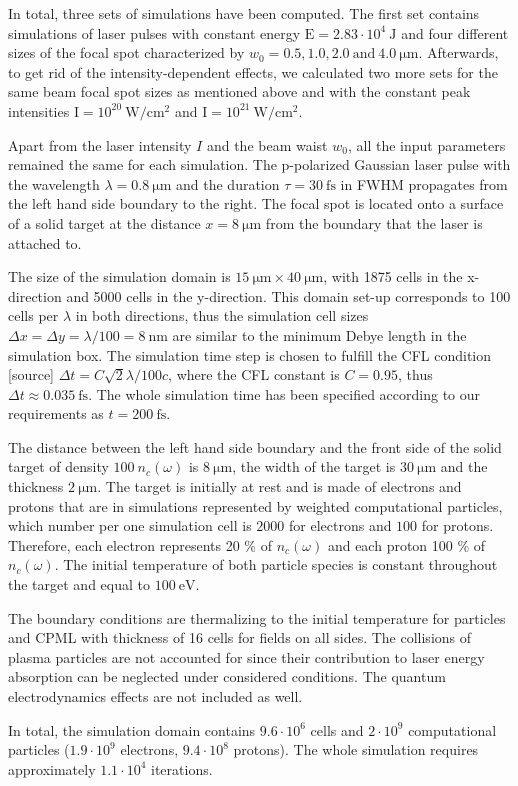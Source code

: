 In total, three sets of simulations have been computed. The first set contains simulations of laser pulses with constant energy $ \mathrm{E} = 2.83 \cdot 10^{4} \ \mathrm{J} $ and four different sizes of the focal spot characterized by $ w_0 = 0.5, 1.0, 2.0 \ \mathrm{and} \ 4.0 \ \mathrm{\mu m} $. Afterwards, to get rid of the intensity-dependent effects, we calculated two more sets for the same beam focal spot sizes as mentioned above and with the constant peak intensities $ \mathrm{I} = 10^{20} \ \mathrm{W/cm^2} $ and $ \mathrm{I} = 10^{21} \ \mathrm{W/cm^2} $.

Apart from the laser intensity $ I $ and the beam waist $ w_0 $, all the input parameters remained the same for each simulation. The p-polarized Gaussian laser pulse with the wavelength $ \lambda = 0.8 \ \mathrm{\mu m} $ and the duration $ \tau = 30 \ \mathrm{fs} $ in FWHM propagates from the left hand side boundary to the right. The focal spot is located onto a surface of a solid target at the distance $ x = 8 \ \mathrm{\mu m} $ from the boundary that the laser is attached to. 

The size of the simulation domain is $ 15 \ \mathrm{\mu m} \times 40 \ \mathrm{\mu m} $, with 1875 cells in the x-direction and 5000 cells in the y-direction. This domain set-up corresponds to 100 cells per $ \lambda $ in both directions, thus the simulation cell sizes $ \Delta x = \Delta y = \lambda/100 = 8 \ \mathrm{nm} $ are similar to the minimum Debye length in the simulation box. The simulation time step is chosen to fulfill the CFL condition [source] $ \Delta t = C \sqrt{2} \lambda/ 100 c $, where the CFL constant is $ C = 0.95 $, thus $ \Delta t \approx 0.035 \ \mathrm{fs} $. The whole simulation time has been specified according to our requirements as $ t = 200 \ \mathrm{fs} $.

The distance between the left hand side boundary and the front side of the solid target of density $ 100 \ n_c \left(\omega \right) $ is $ 8 \ \mathrm{\mu m} $, the width of the target is $ 30 \ \mathrm{\mu m} $ and the thickness $ 2 \ \mathrm{\mu m} $. The target is initially at rest and is made of electrons and protons that are in simulations represented by weighted computational particles, which number per one simulation cell is $ 2000 $ for electrons and $ 100 $ for protons. Therefore, each electron represents 20 \% of $ n_c \left(\omega \right) $ and each proton 100 \% of $ n_c \left(\omega \right) $. The initial temperature of both particle species is constant throughout the target and equal to $ 100 \ \mathrm{eV} $.

The boundary conditions are thermalizing to the initial temperature for particles and CPML with thickness of 16 cells for fields on all sides. The collisions of plasma particles are not accounted for since their contribution to laser energy absorption can be neglected under considered conditions. The quantum electrodynamics effects are not included as well.

In total, the simulation domain contains $ 9.6 \cdot 10^{6} $ cells and $ 2 \cdot 10^{9} $ computational particles ($ 1.9 \cdot 10^{9} $ electrons, $ 9.4 \cdot 10^{8} $ protons). The whole simulation requires approximately $ 1.1 \cdot 10^{4} $ iterations.